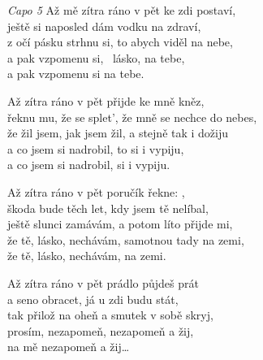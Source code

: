 
\re{}
\textit{Capo 5}
\ve{}
Až mě zítra ráno v pět ke zdi postaví,\\
ještě si naposled dám vodku na zdraví,\\
z očí pásku strhnu si, to abych viděl na nebe,\\
a pak vzpomenu si, \ lásko, na tebe, \\
a pak vzpomenu si na tebe.

\ve{}
Až zítra ráno v pět přijde ke mně kněz,\\
řeknu mu, že se splet', že mně se nechce do nebes,\\
že žil jsem, jak jsem žil, a stejně tak i dožiju\\
a co jsem si nadrobil, to si i vypiju,\\
a co jsem si nadrobil, si i vypiju.

\ve{}
Až zítra ráno v pět poručík řekne: ,\\
škoda bude těch let, kdy jsem tě nelíbal,\\
ještě slunci zamávám, a potom líto přijde mi,\\
že tě, lásko, nechávám, samotnou tady na zemi,\\
že tě, lásko, nechávám, na zemi.

\ve{}
Až zítra ráno v pět prádlo půjdeš prát\\
a seno obracet, já u zdi budu stát,\\
tak přilož na oheň a smutek v sobě skryj,\\
prosím, nezapomeň, nezapomeň a žij,\\
na mě nezapomeň a žij\ldots{} 

\esong